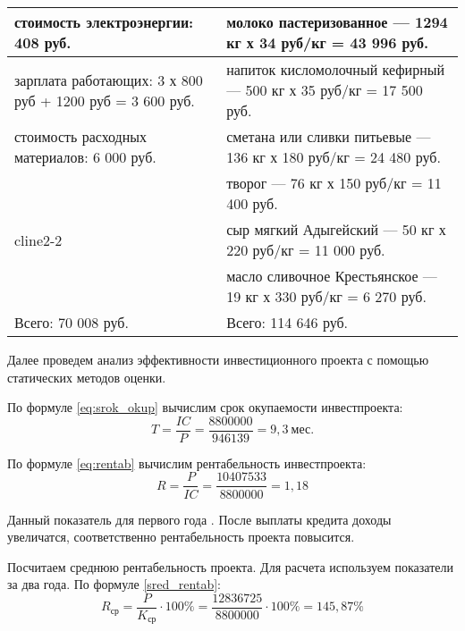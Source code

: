 \begin{table}[]
\begin{tabularx}{\textwidth}{|p{8.05cm}|p{8.05cm}|}
		стоимость электроэнергии: 408 руб.                 & молоко пастеризованное — 1294 кг х 34 руб/кг = 43 996 руб.          \\ \hline
		зарплата работающих: 3 х 800 руб + 1200 руб = 3 600 руб.                                    & напиток кисломолочный кефирный — 500 кг х 35 руб/кг = 17 500 руб.   \\ \hline
		стоимость расходных материалов: 6 000 руб.                & сметана или сливки питьевые — 136 кг х 180 руб/кг = 24 480 руб.     \\ \hline
		                              																& творог — 76 кг х 150 руб/кг = 11 400 руб.                           \\ cline{2-2}
																									& сыр мягкий Адыгейский — 50 кг х 220 руб/кг = 11 000 руб.            \\ \cline{2-2}
																									& масло сливочное Крестьянское — 19 кг х 330 руб/кг = 6 270 руб.      \\ \hline
		Всего:  70 008 руб.                                                    			 & Всего: 114 646 руб.                                                 \\ \hline
	\end{tabularx}
\end{table}

Далее проведем анализ эффективности инвестиционного проекта с помощью статических методов оценки.



По формуле \eqref{eq:srok_okup} вычислим срок окупаемости инвестпроекта:
\begin{equation*}
T=\dfrac{IC}{P} = \dfrac{8 800 000}{946 139} = 9,3\  \text{мес.}
\end{equation*}

По формуле \eqref{eq:rentab} вычислим рентабельность инвестпроекта:
\begin{equation*}
R = \dfrac{P}{IC} = \dfrac{10407533}{8800000} = 1,18
\end{equation*}

Данный показатель для первого года . После выплаты кредита доходы увеличатся, соответственно рентабельность проекта повысится.

Посчитаем среднюю рентабельность проекта. Для расчета используем показатели за два года. По формуле \eqref{sred_rentab}:
\begin{equation*}
R_{\text{ср}} = \dfrac{P}{K_{\text{ср}}} \cdot 100\% = \dfrac{12836725}{8800000} \cdot 100\% = 145,87\%
\end{equation*}

